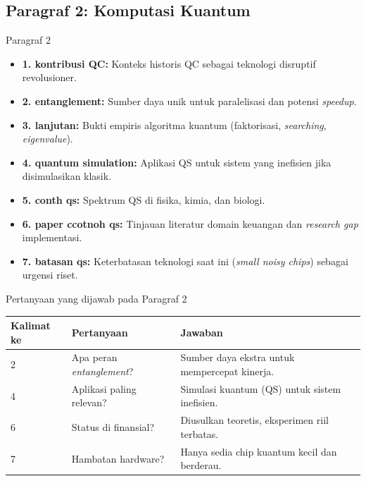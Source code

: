 \subsection{Paragraf 2: Komputasi Kuantum}
\begin{frame}{Paragraf 2}
    \begin{itemize}
        \item \textbf{1. kontribusi QC:} Konteks historis QC sebagai teknologi disruptif revolusioner.
        \item \textbf{2. entanglement:} Sumber daya unik untuk paralelisasi dan potensi \textit{speedup}.
        \item \textbf{3. lanjutan:} Bukti empiris algoritma kuantum (faktorisasi, \textit{searching}, \textit{eigenvalue}).
        \item \textbf{4. quantum simulation:} Aplikasi QS untuk sistem yang inefisien jika disimulasikan klasik.
        \item \textbf{5. conth qs:} Spektrum QS di fisika, kimia, dan biologi.
        \item \textbf{6. paper ccotnoh qs:} Tinjauan literatur domain keuangan dan \textit{research gap} implementasi.
        \item \textbf{7. batasan qs:} Keterbatasan teknologi saat ini (\textit{small noisy chips}) sebagai urgensi riset.
    \end{itemize}
\end{frame}

\begin{frame}{Pertanyaan yang dijawab pada Paragraf 2}
    \centering
    \small
    \begin{tabular}{lp{4.5cm}p{6cm}}
        \toprule
        Kalimat ke & Pertanyaan & Jawaban \\
        \midrule
        2 & Apa peran \textit{entanglement}? & Sumber daya ekstra untuk mempercepat kinerja. \\
        4 & Aplikasi paling relevan? & Simulasi kuantum (QS) untuk sistem inefisien. \\
        6 & Status di finansial? & Diusulkan teoretis, eksperimen riil terbatas. \\
        7 & Hambatan hardware? & Hanya sedia chip kuantum kecil dan berderau. \\
        \bottomrule
    \end{tabular}
\end{frame}

